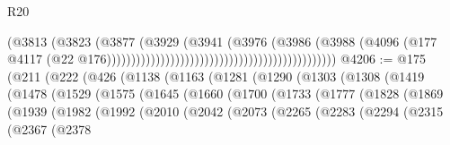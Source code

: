 \begin{lexlean}{R20}
\begin{coremodule}
                                                                            (@3813
                                                                              (@3823
                                                                                (@3877
                                                                                  (@3929
                                                                                    (@3941
                                                                                      (@3976
                                                                                        (@3986
                                                                                          (@3988
                                                                                            (@4096
                                                                                              (@177
                                                                                                @4117
                                                                                                (@22
                                                                                                  @176)))))))))))))))))))))))))))))))))))))))))))))))
@4206 := @175
    (@211
      (@222
        (@426
          (@1138
            (@1163
              (@1281
                (@1290
                  (@1303
                    (@1308
                      (@1419
                        (@1478
                          (@1529
                            (@1575
                              (@1645
                                (@1660
                                  (@1700
                                    (@1733
                                      (@1777
                                        (@1828
                                          (@1869
                                            (@1939
                                              (@1982
                                                (@1992
                                                  (@2010
                                                    (@2042
                                                      (@2073
                                                        (@2265
                                                          (@2283
                                                            (@2294
                                                              (@2315
                                                                (@2367
                                                                  (@2378

\end{coremodule}
\end{lexlean}

